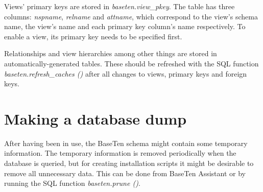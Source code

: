 Views' primary keys are stored in {\itshape baseten.\+view\+\_\+pkey}. The table has three columns\+: {\itshape nspname}, {\itshape relname} and {\itshape attname}, which correspond to the view's schema name, the view's name and each primary key column's name respectively. To enable a view, its primary key needs to be specified first.

Relationships and view hierarchies among other things are stored in automatically-\/generated tables. These should be refreshed with the S\+Q\+L function {\itshape baseten.\+refresh\+\_\+caches ()} after all changes to views, primary keys and foreign keys. \hypertarget{database_dumps}{}\section{Making a database dump}\label{database_dumps}
After having been in use, the Base\+Ten schema might contain some temporary information. The temporary information is removed periodically when the database is queried, but for creating installation scripts it might be desirable to remove all unnecessary data. This can be done from Base\+Ten Assistant or by running the S\+Q\+L function {\itshape baseten.\+prune ()}.

